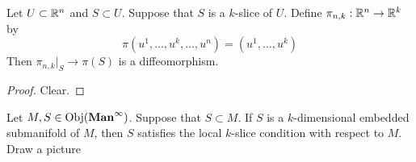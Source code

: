 \documentclass{book}
\begin{document}
	\begin{ex}
		Let $U \subset \mathbb{R}^n$ and $S \subset U$. Suppose that $S$ is a $k$-slice of $U$. Define $\pi_{n,k}: \mathbb{R}^n \rightarrow \mathbb{R}^k$ by $$\pi(u^1, \dots, u^k, \dots, u^n) = (u^1, \dots, u^k)$$ Then $\pi_{n,k}|_{S} \rightarrow \pi(S)$ is a diffeomorphism.
	\end{ex}	
	
	\begin{proof}
		Clear. 
	\end{proof}

	\begin{ex}
		Let $M,S \in \operatorname{Obj}(\operatorname*{\text{\textbf{Man}}^{\infty}})$. Suppose that $S \subset M$. If $S$ is a $k$-dimensional embedded submanifold of $M$, then $S$ satisfies the local $k$-slice condition with respect to $M$. \\
		 Draw a picture
	\end{ex}
\end{document}
